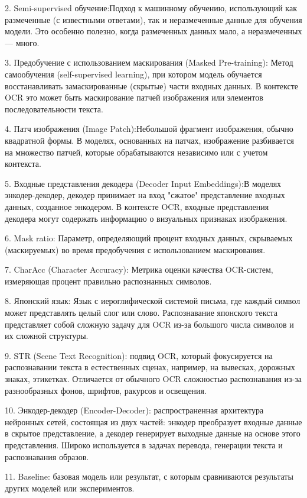 2. Semi-supervised обучение:Подход к машинному обучению, использующий как размеченные (с известными ответами), так и неразмеченные данные для обучения модели. Это особенно полезно, когда размеченных данных мало, а неразмеченных — много.

3. Предобучение с использованием маскирования (Masked Pre-training): Метод самообучения (self-supervised learning), при котором модель обучается восстанавливать замаскированные (скрытые) части входных данных.  В контексте OCR это может быть маскирование патчей изображения или элементов последовательности текста.

4. Патч изображения (Image Patch):Небольшой фрагмент изображения, обычно квадратной формы. В моделях, основанных на патчах, изображение разбивается на множество патчей, которые обрабатываются независимо или с учетом контекста.

5.  Входные представления декодера (Decoder Input Embeddings):В моделях энкодер-декодер, декодер принимает на вход  "сжатое" представление входных данных, созданное энкодером.  В контексте OCR,  входные представления декодера  могут содержать информацию о визуальных  признаках  изображения.

6.  Mask ratio: Параметр, определяющий процент входных данных, скрываемых (маскируемых) во время предобучения с использованием маскирования. 

7. CharAcc (Character Accuracy): Метрика оценки качества  OCR-систем, измеряющая процент правильно распознанных символов. 

8. Японский язык: Язык с  иероглифической  системой письма,  где  каждый символ может представлять целый слог  или  слово.   Распознавание японского текста представляет собой сложную задачу для OCR  из-за  большого  числа  символов и  их  сложной  структуры.

9. STR (Scene Text Recognition):  подвид OCR, который фокусируется на распознавании текста в естественных сценах, например, на вывесках, дорожных знаках, этикетках. Отличается от обычного OCR сложностью распознавания из-за разнообразных фонов, шрифтов, ракурсов и освещения.

10. Энкодер-декодер (Encoder-Decoder):  распространенная архитектура нейронных сетей, состоящая из двух частей:  энкодер преобразует входные данные в скрытое представление, а декодер  генерирует выходные данные на основе этого представления.  Широко используется в задачах перевода,  генерации текста и распознавания образов.

11. Baseline: базовая модель или результат, с которым сравниваются результаты  других моделей или  экспериментов. 

